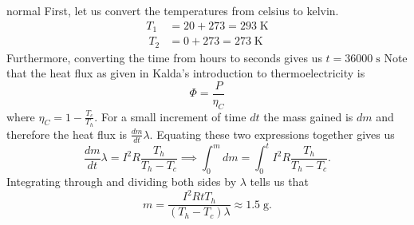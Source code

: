 \begin{solution}{normal}
First, let us convert the temperatures from celsius to kelvin.
\begin{align*}
T_1 &= 20 + 273 = 293\;\mathrm{K}\\\
T_2 &= 0 + 273 = 273\;\mathrm{K}
\end{align*}Furthermore, converting the time from hours to seconds gives us $t = 36000\;\mathrm{s}$
Note that the heat flux as given in Kalda’s introduction to thermoelectricity is
\[\Phi = \frac{P}{\eta_C}\]
where $\eta_C = 1 - \frac{T_c}{T_h}$. For a small increment of time $dt$ the mass gained is $dm$ and therefore the heat flux is $\frac{dm}{dt}\lambda$. Equating these two expressions together gives us 
\[\frac{dm}{dt}\lambda = I^2 R\frac{T_h}{T_h - T_c}\implies \int_{0}^{m} dm = \int_{0}^{t} I^2 R \frac{T_h}{T_h - T_c}.\]
Integrating through and dividing both sides by $\lambda$ tells us that 
\[m = \boxed{\frac{I^2 R tT_h}{(T_h - T_c)\lambda}\approx 1.5\;\mathrm{g}}.\]
\end{solution}